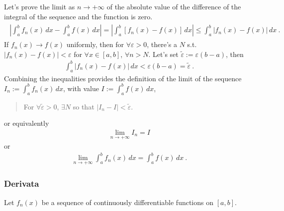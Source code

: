 \documentclass[letterpaper,10pt,italian]{jupyterBook}
\begin{document}
\sphinxAtStartPar
{} Let’s prove the limit as \(n \rightarrow +\infty\) of the absolute value of the difference of the integral of the sequence and the function is zero.
\begin{equation*}
\begin{split}\begin{aligned}
  \left| \int_{a}^{b} f_n(x) \, dx - \int_{a}^{b} f(x) \, dx \right| =
  \left| \int_{a}^{b} \left[ f_n(x) - f(x) \right] \, dx \right| \le
  \int_{a}^{b} \left| f_n(x) - f(x) \right| \, dx \ .
\end{aligned}\end{split}
\end{equation*}
\sphinxAtStartPar
If \(f_n(x) \rightarrow f(x)\) uniformly, then for \(\forall \varepsilon > 0\), there’s a \(N\) s.t. \(|f_n(x) - f(x)| < \varepsilon\) for \(\forall x \in [a,b]\), \(\forall n > N\). Let’s set \(\widetilde{\varepsilon} := \varepsilon (b-a)\), then
\begin{equation*}
\begin{split}\int_{a}^{b} \left| f_n(x) - f(x) \right| \, dx < \varepsilon (b-a) = \widetilde{\varepsilon} \ .\end{split}
\end{equation*}
\sphinxAtStartPar
Combining the inequalities provides the definition of the limit of the sequence \(I_n := \int_{a}^{b} f_n(x) \, dx\), with value \(I := \int_{a}^{b} f(x) \, dx\),
\begin{quote}

\sphinxAtStartPar
For \(\forall \widetilde{\varepsilon} > 0\), \(\exists N\) so that \( | I_n - I | < \widetilde{\varepsilon} \).
\end{quote}

\sphinxAtStartPar
or equivalently
\begin{equation*}
\begin{split}\lim_{n \rightarrow +\infty} I_n = I\end{split}
\end{equation*}
\sphinxAtStartPar
or
\begin{equation*}
\begin{split}\lim_{n \rightarrow +\infty} \int_{a}^{b} f_n(x) \, dx = \int_{a}^{b} f(x) \, dx \ .\end{split}
\end{equation*}

\subsubsection{Derivata}
\label{\detokenize{ch/series/series-functions-real:derivata}}
\sphinxAtStartPar
Let \(f_n(x)\) be a sequence of continuously differentiable functions on \([a,b]\).
\end{document}
